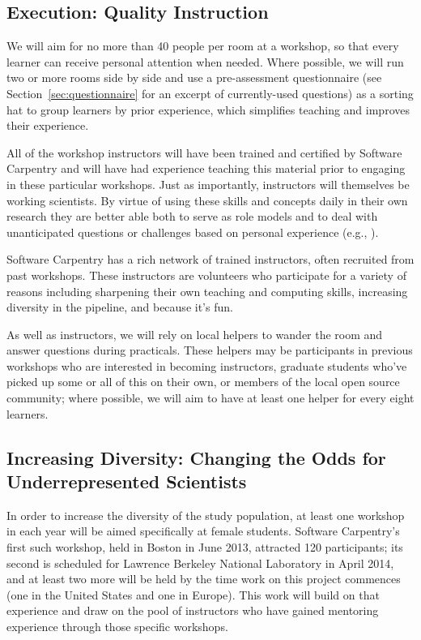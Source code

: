 \documentclass{proposalnsf}
\newlength{\up}
\begin{document}
\subsection{Execution: Quality Instruction}

We will aim for no more than 40 people per room at a workshop, so that
every learner can receive personal attention when needed.  Where
possible, we will run two or more rooms side by side and use a
pre-assessment questionnaire (see Section~\ref{sec:questionnaire} for
an excerpt of currently-used questions) as a sorting hat to group
learners by prior experience, which simplifies teaching and improves
their experience.

All of the workshop instructors will have been trained and certified
by Software Carpentry and will have had experience teaching this
material prior to engaging in these particular workshops.  Just as
importantly, instructors will themselves be working scientists. By
virtue of using these skills and concepts daily in their own research
they are better able both to serve as role models and to deal with
unanticipated questions or challenges based on personal experience
(e.g., \cite{ram2013}).

Software Carpentry has a rich network of trained instructors, often recruited 
from past workshops. These instructors are volunteers who participate for a 
variety of reasons including sharpening their own teaching and computing skills, 
increasing diversity in the pipeline, and because it's fun. 

As well as instructors, we will rely on local helpers to wander the room and
answer questions during practicals. These helpers may be participants in
previous workshops who are interested in becoming instructors, graduate
students who've picked up some or all of this on their own, or members
of the local open source community; where possible, we will aim to have at
least one helper for every eight learners.

\subsection{Increasing Diversity: Changing the Odds for Underrepresented Scientists}
\label{sec:diversity}

In order to increase the diversity of the study population, at least
one workshop in each year will be aimed specifically at female
students.  Software Carpentry's first such workshop, held in Boston in
June 2013, attracted 120 participants; its second is scheduled for
Lawrence Berkeley National Laboratory in April 2014, and at least two
more will be held by the time work on this project commences (one in
the United States and one in Europe).  This work will build on that
experience and draw on the pool of instructors who have gained
mentoring experience through those specific workshops.
\end{document}
